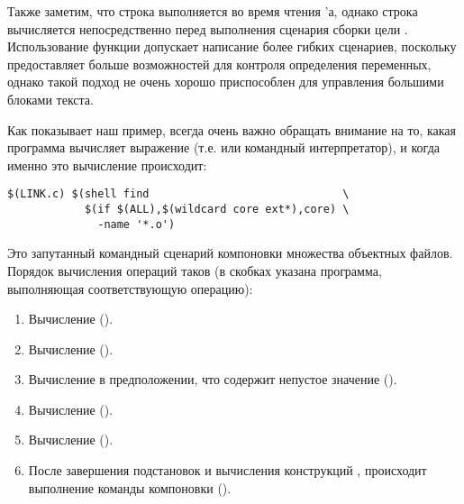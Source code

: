 Также заметим, что строка  выполняется во время
чтения \Makefile{}'а, однако строка  вычисляется
непосредственно перед выполнения сценария сборки цели
. Использование функции 
допускает написание более гибких сценариев, поскольку предоставляет
больше возможностей для контроля определения переменных, однако такой
подход не очень хорошо приспособлен для управления большими блоками
текста.

Как показывает наш пример, всегда очень важно обращать внимание на то,
какая программа вычисляет выражение (т.е. \GNUmake{} или командный
интерпретатор), и когда именно это вычисление происходит:

{\footnotesize
\begin{verbatim}
$(LINK.c) $(shell find                              \
            $(if $(ALL),$(wildcard core ext*),core) \
              -name '*.o')
\end{verbatim}
}

Это запутанный командный сценарий компоновки множества объектных
файлов. Порядок вычисления операций таков (в скобках указана
программа, выполняющая соответствующую операцию):

\begin{enumerate}
\item Вычисление  (\GNUmake{}).
\item Вычисление   (\GNUmake{}).
\item Вычисление \function{wildcard} в предположении, что
  \variable{ALL} содержит непустое значение (\GNUmake{}).
\item Вычисление \function{shell} (\GNUmake{}).
\item Вычисление \utility{find} ().
\item После завершения подстановок и вычисления конструкций
  \GNUmake{}, происходит выполнение команды компоновки
  (\utility{sh}).
\end{enumerate}
